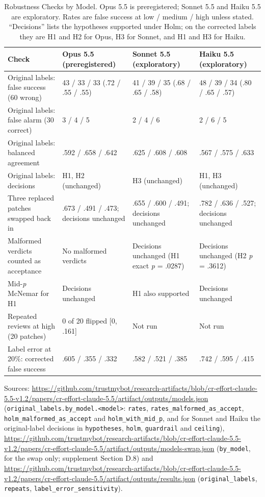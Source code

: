 \documentclass[sigconf,nonacm]{acmart}
\newcommand{\code}[1]{\texttt{#1}}
\begin{document}
\begin{table}[t]
\caption{Robustness Checks by Model. Opus 5.5 is preregistered; Sonnet 5.5 and Haiku 5.5 are exploratory. Rates are false success at low / medium / high unless stated. ``Decisions'' lists the hypotheses supported under Holm; on the corrected labels they are H1 and H2 for Opus, H3 for Sonnet, and H1 and H3 for Haiku.}\label{tab:robust}
\small
\begin{tabular}{@{}L{4.6cm}L{3.9cm}L{3.9cm}L{3.9cm}@{}}
\toprule
Check & Opus 5.5 (preregistered) & Sonnet 5.5 (exploratory) & Haiku 5.5 (exploratory) \\
\midrule
Original labels: false success (60 wrong) & 43 / 33 / 33 (.72 / .55 / .55) & 41 / 39 / 35 (.68 / .65 / .58) & 48 / 39 / 34 (.80 / .65 / .57) \\
Original labels: false alarm (30 correct) & 3 / 4 / 5 & 2 / 4 / 6 & 2 / 6 / 5 \\
Original labels: balanced agreement & .592 / .658 / .642 & .625 / .608 / .608 & .567 / .575 / .633 \\
Original labels: decisions & H1, H2 (unchanged) & H3 (unchanged) & H1, H3 (unchanged) \\
Three replaced patches swapped back in & .673 / .491 / .473; decisions unchanged & .655 / .600 / .491; decisions unchanged & .782 / .636 / .527; decisions unchanged \\
Malformed verdicts counted as acceptance & No malformed verdicts & Decisions unchanged (H1 exact \textit{p} = .0287) & Decisions unchanged (H2 \textit{p} = .3612) \\
Mid-\textit{p} McNemar for H1 & Decisions unchanged & H1 also supported & Decisions unchanged \\
Repeated reviews at high (20 patches) & 0 of 20 flipped [0, .161] & Not run & Not run \\
Label error at 20\%: corrected false success & .605 / .355 / .332 & .582 / .521 / .385 & .742 / .595 / .415 \\
\bottomrule
\end{tabular}

\smallskip
\raggedright\footnotesize Sources: \url{https://github.com/trustmybot/research-artifacts/blob/cr-effort-claude-5.5-v1.2/papers/cr-effort-claude-5.5/artifact/outputs/models.json} (\code{original\_labels.by\_model.<model>}: \code{rates}, \code{rates\_malformed\_as\_accept}, \code{holm\_malformed\_as\_accept} and \code{holm\_with\_mid\_p}, and for Sonnet and Haiku the original-label decisions in \code{hypotheses}, \code{holm}, \code{guardrail} and \code{ceiling}), \url{https://github.com/trustmybot/research-artifacts/blob/cr-effort-claude-5.5-v1.2/papers/cr-effort-claude-5.5/artifact/outputs/models-swap.json} (\code{by\_model}, for the swap only; supplement Section D.8) and \url{https://github.com/trustmybot/research-artifacts/blob/cr-effort-claude-5.5-v1.2/papers/cr-effort-claude-5.5/artifact/outputs/results.json} (\code{original\_labels}, \code{repeats}, \code{label\_error\_sensitivity}).
\end{table}
\end{document}
